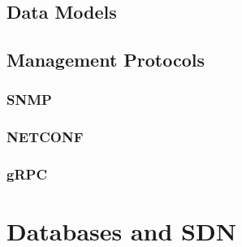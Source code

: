\subsection {Data Models}
\subsection {Management Protocols}
\subsubsection {SNMP}
\subsubsection {NETCONF}
\subsubsection {gRPC}
\section {Databases and SDN} %

